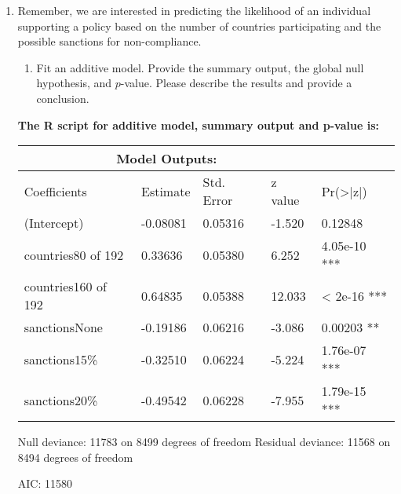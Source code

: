 \documentclass[12pt,letterpaper]{article}
\begin{document}
\begin{enumerate}
	\item
	Remember, we are interested in predicting the likelihood of an individual supporting a policy based on the number of countries participating and the possible sanctions for non-compliance.
	\begin{enumerate}
		\item [] Fit an additive model. Provide the summary output, the global null hypothesis, and $p$-value. Please describe the results and provide a conclusion.
	\end{enumerate}
	\vspace{.8cm}
	\textbf{		The R script for additive model, summary output and p-value is:}
	 
	\vspace{.8cm}
	\begin{tabular}
		{ |p{4cm}||p{3cm}|p{3cm}|p{3cm}|p{3cm}  }
		\hline
		\multicolumn{4}{|c|}{Model Outputs:} \\
		\hline
		Coefficients&Estimate&Std. Error &z value &Pr(>|z|)\\
		\hline
		(Intercept)       &-0.08081    &0.05316  &-1.520  &0.12848\\
		countries80 of 192   &0.33636    &0.05380   &6.252 &4.05e-10 ***\\
		countries160 of 192  &0.64835    &0.05388  &12.033  &< 2e-16 ***\\ sanctionsNone       &-0.19186    &0.06216  &-3.086  &0.00203 **\\ sanctions15\%        &-0.32510    &0.06224  &-5.224 &1.76e-07 ***\\ sanctions20\%       & -0.49542    &0.06228  &-7.955 &1.79e-15 ***\\
		
		\hline
		
		\end{tabular}



\newline Null deviance: 11783  on 8499  degrees of freedom
\newline Residual deviance: 11568  on 8494  degrees of freedom

AIC: 11580


\end{enumerate}
\end{document}
